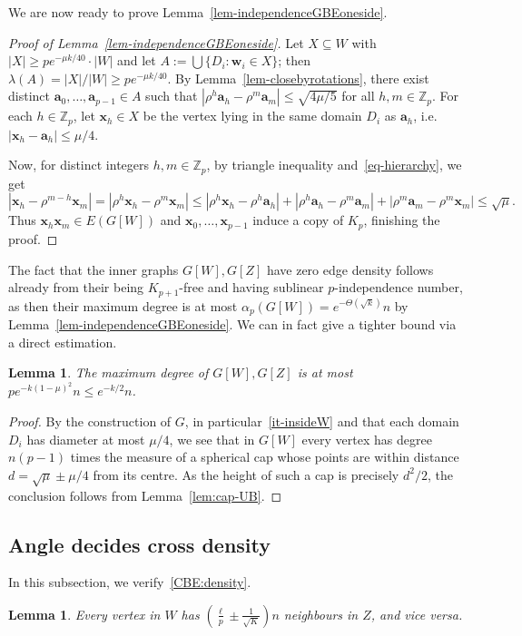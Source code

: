 \documentclass[11pt, a4paper]{article}
\newcommand{\V}[1]{\mathbold{#1}}
\newtheorem{lemma}[theorem]{Lemma}
\theoremstyle{definition}
\newcommand{\sZ}{\mathbb{Z}}
\begin{document}
We are now ready to prove Lemma~\ref{lem-independenceGBEoneside}.
\begin{proof}[Proof of Lemma~\ref{lem-independenceGBEoneside}]
Let $X\subseteq W$ with $|X|\ge pe^{-\mu k/40}\cdot|W|$
	and let $A:=\bigcup\{D_i:\V{w}_i\in X\}$; then $\lambda(A)=|X|/|W|\ge pe^{-\mu k/40}$. By Lemma~\ref{lem-closebyrotations}, there exist distinct $\V{a}_0,\ldots,\V{a}_{p-1}\in A$ such that $|\rho^h\V{a}_h-\rho^m\V{a}_m|\le \sqrt{4\mu/5}$ for all $h,m\in \sZ_p$. For each $h\in \sZ_p$, let $\V{x}_h\in X$ be the vertex lying in the same domain $D_i$ as $\V{a}_h$, i.e. $|\V{x}_h-\V{a}_h|\le \mu/4$. 
	
	Now, for distinct integers $h,m\in \sZ_p$, by triangle inequality and~\eqref{eq-hierarchy}, we get
	\begin{equation*}
		|\V{x}_h-\rho^{m-h}\V{x}_m|=|\rho^h\V{x}_h-\rho^m\V{x}_m|\le |\rho^h\V{x}_h-\rho^h\V{a}_h|+|\rho^h\V{a}_h-\rho^m\V{a}_m|+|\rho^m\V{a}_m-\rho^m\V{x}_m|\le\sqrt{\mu}.
	\end{equation*}
	Thus $\V{x}_h\V{x}_m\in E(G[W])$ and $\V{x}_0,\ldots,\V{x}_{p-1}$ induce a copy of $K_p$, finishing the proof.
\end{proof}

The fact that the inner graphs $G[W],G[Z]$ have zero edge density follows already from their being $K_{p+1}$-free and having sublinear $p$-independence number, as then their maximum degree is at most $\alpha_p(G[W])=e^{-\Theta(\sqrt{k})}n$ by Lemma~\ref{lem-independenceGBEoneside}. We can in fact give a tighter bound via a direct estimation. 
\begin{lemma}\label{lem-maxinsidedeg}
	The maximum degree of $G[W], G[Z]$ is at most $pe^{-k(1-\mu)^2}n\le e^{-k/2}n$. 
\end{lemma}

\begin{proof}
	By the construction of $G$, in particular~\ref{it-insideW} and that each domain $D_i$ has diameter at most $\mu/4$, we see that in $G[W]$ every vertex has degree $n(p-1)$ times the measure of a spherical cap whose points are within distance $d=\sqrt{\mu}\pm \mu/4$ from its centre. As the height of such a cap is precisely $d^2/2$, the conclusion follows from Lemma~\ref{lem:cap-UB}.
\end{proof}




\subsection{Angle decides cross density}
In this subsection, we verify~\ref{CBE:density}.
\begin{lemma}\label{lem-mindegree}
	Every vertex in $W$ has $(\frac{\ell}{p}\pm \frac{1}{\sqrt{K}}) n$  neighbours in $Z$, and vice versa.
\end{lemma}
\end{document}
